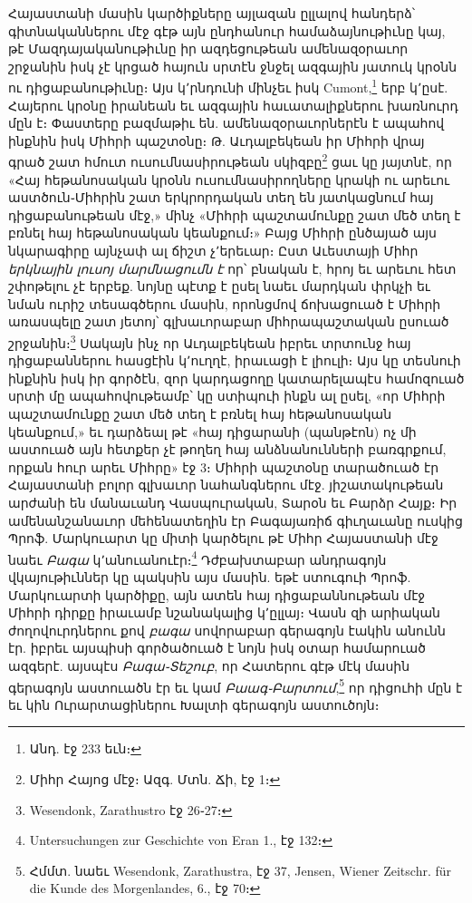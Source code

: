 \documentclass{article}
\begin{document}
{Հայաստանի մասին կարծիքները այլազան ըլլալով հանդերձ՝ գիտնականներու մէջ գէթ այն ընդհանուր համաձայնութիւնը կայ, թէ Մազդայականութիւնը իր ազդեցութեան ամենազօրաւոր շրջանին իսկ չէ կրցած հայուն սրտէն ջնջել ազգային յատուկ կրօնն ու դիցաբանութիւնը։ Այս կ՚րնդունի մինչեւ իսկ Cumont,\footnote{Անդ. էջ 233 եւն։} երբ կ՚ըսէ. Հայերու կրօնը իրանեան եւ ազգային հաւատալիքներու խառնուրդ մըն է։ Փաստերը բազմաթիւ են. ամենազօրաւորներէն է ապահով ինքնին իսկ Միհրի պաշտօնը։ Թ. Աւդալբեկեան իր Միհրի վրայ գրած շատ հմուտ ուսումնասիրութեան սկիզբը\footnote{Միհր Հայոց մէջ։ Ազգ. Մտն. Ճի, էջ 1։} ցաւ կը յայտնէ, որ «Հայ հեթանոսական կրօնն ուսումնասիրողները կրակի ու արեւու աստծուն֊Միհրին շատ երկրորդական տեղ են յատկացնում հայ դիցաբանութեան մէջ,» մինչ «Միհրի պաշտամունքը շատ մեծ տեղ է բռնել հայ հեթանոսական կեանքում։» Բայց Միհրի ընծայած այս նկարագիրը այնչափ ալ ճիշտ չ՚երեւար։ Ըստ Աւեստայի Միհր \emph{երկնային լուսոյ մարմնացումն է} որ՝ բնական է, հրոյ եւ արեւու հետ շփոթելու չէ երբեք. նոյնը պէտք է ըսել նաեւ մարդկան փրկչի եւ նման ուրիշ տեսագծերու մասին, որոնցմով ճոխացուած է Միհրի առասպելը շատ յետոյ՝ գլխաւորաբար միհրապաշտական ըսուած շրջանին։\footnote{Wesendonk, Zarathustro էջ 26֊27։} Սակայն ինչ որ Աւդալբեկեան իբրեւ տրտունջ հայ դիցաբաններու հասցէին կ՚ուղղէ, իրաւացի է լիուլի։ Այս կը տեսնուի ինքնին իսկ իր գործէն, զոր կարդացողը կատարելապէս համոզուած սրտի մը ապահովութեամբ՝ կը ստիպուի ինքն ալ ըսել, «որ Միհրի պաշտամունքը շատ մեծ տեղ է բռնել հայ հեթանոսական կեանքում,» եւ դարձեալ թէ «հայ դիցարանի (պանթէոն) ոչ մի աստուած այն հետքեր չէ թողեղ հայ անձնանունների բառգրքում, որքան հուր արեւ Միհրը» էջ 3։ Միհրի պաշտօնը տարածուած էր Հայաստանի բոլոր գլխաւոր նահանգներու մէջ. յիշատակութեան արժանի են մանաւանդ Վասպուրական, Տարօն եւ Բարձր Հայք։ Իր ամենանշանաւոր մեհենատեղին էր Բագայառիճ գիւղաւանը ուսկից Պրոֆ. Մարկուարտ կը միտի կարծելու թէ Միհր Հայաստանի մէջ նաեւ \emph{Բագա} կ՚անուանուէր։\footnote{Untersuchungen zur Geschichte von Eran 1., էջ 132։} Դժբախտաբար անդրագոյն վկայութիւններ կը պակսին այս մասին. եթէ ստուգուի Պրոֆ. Մարկուարտի կարծիքը, այն ատեն հայ դիցաբաննութեան մէջ Միհրի դիրքը իրաւամբ նշանակալից կ՚ըլլայ։ Վասն զի արիական ժողովուրդներու քով \emph{բագա} սովորաբար գերագոյն էակին անունն էր. իբրեւ այսպիսի գործածուած է նոյն իսկ օտար համարուած ազգերէ. այսպէս \emph{Բագա֊Տեշուբ}, որ Հատերու գէթ մէկ մասին գերագոյն աստուածն էր եւ կամ \emph{Բաագ֊Բարտում},\footnote{Հմմտ. նաեւ Wesendonk, Zarathustra, էջ 37, Jensen, Wiener Zeitschr. für die Kunde des Morgenlandes, 6., էջ 70։} որ դիցուհի մըն է եւ կին Ուրարտացիներու Խալտի գերագոյն աստուծոյն։

}
\end{document}
